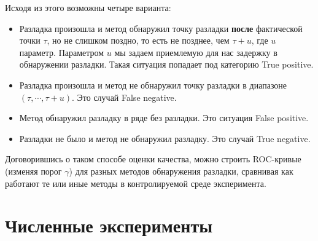 \documentclass[%
12pt,
master,  %
natbib,      %
subf,        %
substylefile = spbu.rtx,
href,        %
colorlinks,  %
]{disser}
\begin{document}

Исходя из этого возможны четыре варианта:


\begin{itemize}
	\item Разладка произошла и метод обнаружил точку разладки \textbf{после} фактической точки $\tau$, но не слишком поздно, то есть не позднее, чем $\tau + u$, где $u$ параметр. Параметром $u$ мы задаем приемлемую для нас задержку в обнаружении разладки. Такая ситуация попадает под категорию True positive.
	\item Разладка произошла и метод не обнаружил точку разладки в диапазоне $(\tau, \cdots, \tau + u)$. Это случай False negative.
	\item Метод обнаружил разладку в ряде без разладки. Это ситуация False positive.
	\item Разладки не было и метод не обнаружил разладку. Это случай True negative.
\end{itemize}

Договорившись о таком способе оценки качества, можно строить ROC-кривые (изменяя порог $\gamma$) для разных методов обнаружения разладки, сравнивая как работают те или иные методы в контролируемой среде эксперимента.


\chapter{Численные эксперименты}
\end{document}
